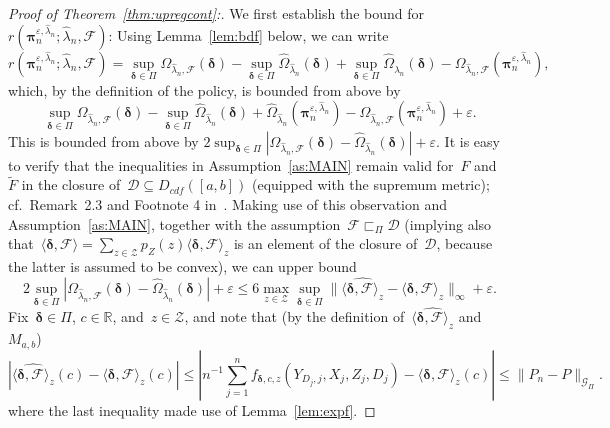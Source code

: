 \documentclass[11pt, a4paper]{article}
\newcommand{\R}{\mathbb{R}}
\theoremstyle{definition}
\begin{document}
\begin{proof}[Proof of Theorem~\ref{thm:upregcont}:]
We first establish the bound for~$r(\bm{\pi}^{\varepsilon,   \hat{\lambda}_n}_n;   \hat{\lambda}_n, \mathcal{F})$: Using Lemma~\ref{lem:bdf} below, we can write 
$$r(\bm{\pi}^{\varepsilon,   \hat{\lambda}_n}_n; \hat{\lambda}_n, \mathcal{F}) = \sup_{\bm{\delta} \in \Pi} \Omega_{\hat{\lambda}_n, \mathcal{F}}(\bm{\delta}) - \sup_{\bm{\delta} \in \Pi} \hat{\Omega}_{\hat{\lambda}_n}\left(\bm{\delta} \right) + \sup_{\bm{\delta} \in \Pi} \hat{\Omega}_{\hat{\lambda}_n}\left(\bm{\delta}\right) - \Omega_{\hat{\lambda}_n, \mathcal{F}} \left(\bm{\pi}^{\varepsilon,   \hat{\lambda}_n}_n \right),$$ which, by the definition of the policy, is bounded from above by
$$
\sup_{\bm{\delta} \in \Pi} \Omega_{\hat{\lambda}_n, \mathcal{F}}(\bm{\delta}) - \sup_{\bm{\delta} \in \Pi} \hat{\Omega}_{\hat{\lambda}_n}\left(\bm{\delta} \right) + \hat{\Omega}_{\hat{\lambda}_n}\left(\bm{\pi}^{\varepsilon,   \hat{\lambda}_n}_n\right) - \Omega_{\hat{\lambda}_n, \mathcal{F}} \left(\bm{\pi}^{\varepsilon,   \hat{\lambda}_n}_n \right) + \varepsilon.
$$
This is bounded from above by
$
2 \sup_{\bm{\delta} \in \Pi} |\Omega_{\hat{\lambda}_n, \mathcal{F}}(\bm{\delta}) - \hat{\Omega}_{\hat{\lambda}_n}(\bm{\delta}) | + \varepsilon.
$ It is easy to verify that the inequalities in Assumption~\ref{as:MAIN} remain valid for~$F$ and~$\tilde{F}$ in the closure of~$\mathscr{D} \subseteq D_{cdf}([a,b])$ (equipped with the supremum metric); cf.~Remark~2.3 and Footnote 4 in~\cite{kpv1}. Making use of this observation and Assumption~\ref{as:MAIN}, together with the assumption~$\mathcal{F} \sqsubset_{\Pi} \mathscr{D}$ (implying also that~$\langle \bm{\delta}, \mathcal{F} \rangle = \sum_{z \in \mathcal{Z}} p_Z(z) \langle \bm{\delta}, \mathcal{F} \rangle_z$ is an element of the closure of~$\mathscr{D}$, because the latter is assumed to be convex), we can upper bound
%
\begin{equation}\label{eqn:contXrbdprf}
2 \sup_{\bm{\delta} \in \Pi} |\Omega_{\hat{\lambda}_n, \mathcal{F}}(\bm{\delta}) - \hat{\Omega}_{\hat{\lambda}_n}(\bm{\delta}) | + \varepsilon \leq 6 \max_{z \in \mathcal{Z}} \sup_{\bm{\delta} \in \Pi} \|\widehat{\langle \bm{\delta}, \mathcal{F} \rangle_z} - \langle \bm{\delta}, \mathcal{F} \rangle_z \|_\infty + \varepsilon.
\end{equation}
%
Fix~$\bm{\delta} \in \Pi$, $c \in \R$, and~$z \in \mathcal{Z}$, and note that (by the definition of~$\widehat{\langle \bm{\delta}, \mathcal{F} \rangle_z}$ and~$M_{a,b}$)~
\begin{equation}\label{eqn:contXrbdprf2}
|\widehat{\langle \bm{\delta}, \mathcal{F} \rangle_z}(c) - \langle \bm{\delta}, \mathcal{F} \rangle_z(c) | \leq | n^{-1} \sum_{j = 1}^n f_{\bm{\delta}, c, z}(Y_{D_j, j}, X_j, Z_j, D_j) - \langle \bm{\delta}, \mathcal{F} \rangle_z(c) | \leq \|P_n - P\|_{\mathcal{G}_{\Pi}}.
\end{equation} where the last inequality made use of Lemma~\ref{lem:expf}.


\end{proof}
\end{document}
